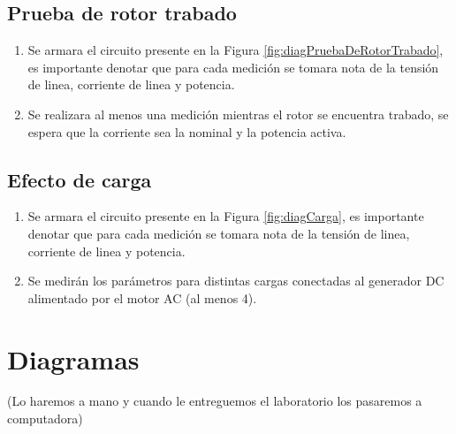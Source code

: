 \documentclass[11pt,letterpaper]{article}     %
\begin{document}
\subsection{Prueba de rotor trabado}
\begin{enumerate}
	\item Se armara el circuito presente en la Figura \ref{fig:diagPruebaDeRotorTrabado}, es importante denotar que para cada medición se tomara nota de la tensión  de linea, corriente de linea y potencia.
	\item Se realizara al menos una medición mientras el rotor se encuentra trabado, se espera que la corriente sea la nominal y la potencia activa.
\end{enumerate}
\subsection{Efecto de carga}
\begin{enumerate}
	\item Se armara el circuito presente en la Figura \ref{fig:diagCarga}, es importante denotar que para cada medición se tomara nota de la tensión  de linea, corriente de linea y potencia.
	\item Se medirán los parámetros para distintas cargas conectadas al generador DC alimentado por el motor AC (al menos 4).
\end{enumerate}
\section{Diagramas}
(Lo haremos a mano y cuando le entreguemos el laboratorio los pasaremos a computadora)
\end{document}
